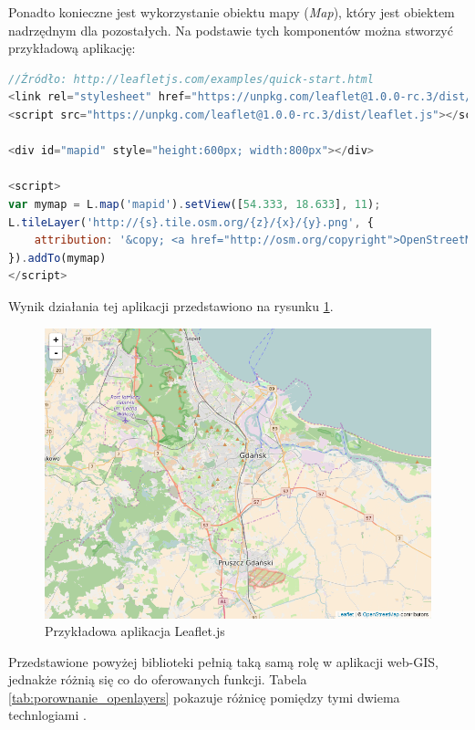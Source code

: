 Ponadto konieczne jest wykorzystanie obiektu mapy (\textit{Map}), który jest obiektem nadrzędnym dla pozostałych.
Na podstawie tych komponentów można stworzyć przykładową aplikację:
\begin{lstlisting}[frame=L, language=JavaScript, caption={Przykładowa aplikacja w Leaflet.js}]
//Źródło: http://leafletjs.com/examples/quick-start.html
<link rel="stylesheet" href="https://unpkg.com/leaflet@1.0.0-rc.3/dist/leaflet.css" />
<script src="https://unpkg.com/leaflet@1.0.0-rc.3/dist/leaflet.js"></script>
 
<div id="mapid" style="height:600px; width:800px"></div>

<script>
var mymap = L.map('mapid').setView([54.333, 18.633], 11);
L.tileLayer('http://{s}.tile.osm.org/{z}/{x}/{y}.png', {
    attribution: '&copy; <a href="http://osm.org/copyright">OpenStreetMap</a> contributors'
}).addTo(mymap)
</script>
\end{lstlisting}

Wynik działania tej aplikacji przedstawiono na rysunku \ref{fig:leaflet_example}.

\begin{figure}[h!]
    \centering
    \includegraphics[width=1.0\textwidth]{img/leaflet_example.png}
    \caption{Przykładowa aplikacja Leaflet.js}
    \label{fig:leaflet_example}
\end{figure}

Przedstawione powyżej biblioteki pełnią taką samą rolę w aplikacji web-GIS, jednakże różnią się co do oferowanych funkcji.
Tabela \ref{tab:porownanie_openlayers} pokazuje różnicę pomiędzy tymi dwiema technlogiami \cite{website:OpenLayersVSLeaflet}.

